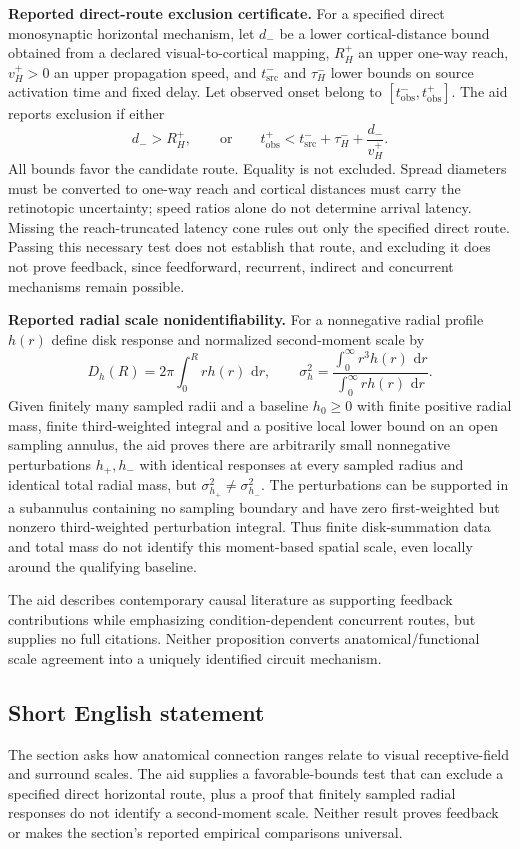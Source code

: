 \documentclass[11pt]{article}
\newcommand{\dd}{\,\mathrm{d}}
\begin{document}
\textbf{Reported direct-route exclusion certificate.} For a specified direct monosynaptic horizontal mechanism, let $d_-$ be a lower cortical-distance bound obtained from a declared visual-to-cortical mapping, $R_H^+$ an upper one-way reach, $v_H^+>0$ an upper propagation speed, and $t_{\mathrm{src}}^-$ and $\tau_H^-$ lower bounds on source activation time and fixed delay. Let observed onset belong to $[t_{\mathrm{obs}}^-,t_{\mathrm{obs}}^+]$. The aid reports exclusion if either
\[
 d_->R_H^+,\qquad\text{or}\qquad
 t_{\mathrm{obs}}^+<t_{\mathrm{src}}^-+\tau_H^-+\frac{d_-}{v_H^+}.
\]
All bounds favor the candidate route. Equality is not excluded. Spread diameters must be converted to one-way reach and cortical distances must carry the retinotopic uncertainty; speed ratios alone do not determine arrival latency. Missing the reach-truncated latency cone rules out only the specified direct route. Passing this necessary test does not establish that route, and excluding it does not prove feedback, since feedforward, recurrent, indirect and concurrent mechanisms remain possible.

\textbf{Reported radial scale nonidentifiability.} For a nonnegative radial profile $h(r)$ define disk response and normalized second-moment scale by
\[
 D_h(R)=2\pi\int_0^Rrh(r)\,\dd r,\qquad
 \sigma_h^2=\frac{\int_0^\infty r^3h(r)\,\dd r}{\int_0^\infty rh(r)\,\dd r}.
\]
Given finitely many sampled radii and a baseline $h_0\geq0$ with finite positive radial mass, finite third-weighted integral and a positive local lower bound on an open sampling annulus, the aid proves there are arbitrarily small nonnegative perturbations $h_+,h_-$ with identical responses at every sampled radius and identical total radial mass, but $\sigma_{h_+}^2\ne\sigma_{h_-}^2$. The perturbations can be supported in a subannulus containing no sampling boundary and have zero first-weighted but nonzero third-weighted perturbation integral. Thus finite disk-summation data and total mass do not identify this moment-based spatial scale, even locally around the qualifying baseline.

The aid describes contemporary causal literature as supporting feedback contributions while emphasizing condition-dependent concurrent routes, but supplies no full citations. Neither proposition converts anatomical/functional scale agreement into a uniquely identified circuit mechanism.
\subsection{Short English statement}
The section asks how anatomical connection ranges relate to visual receptive-field and surround scales. The aid supplies a favorable-bounds test that can exclude a specified direct horizontal route, plus a proof that finitely sampled radial responses do not identify a second-moment scale. Neither result proves feedback or makes the section's reported empirical comparisons universal.
\end{document}
